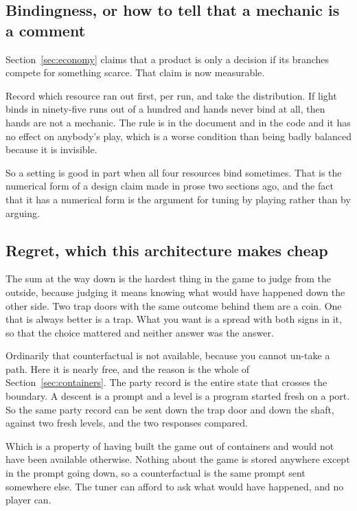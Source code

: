 \documentclass[11pt,a4paper]{article}
\begin{document}
\subsection{Bindingness, or how to tell that a mechanic is a comment}
\label{sec:bind}

Section~\ref{sec:economy} claims that a product is only a decision if its branches compete for
something scarce. That claim is now measurable.

Record which resource ran out first, per run, and take the distribution. If light binds in
ninety-five runs out of a hundred and hands never bind at all, then hands are not a mechanic. The
rule is in the document and in the code and it has no effect on anybody's play, which is a worse
condition than being badly balanced because it is invisible.

\begin{sectionbox}
So a setting is good in part when all four resources bind sometimes. That is the numerical form
of a design claim made in prose two sections ago, and the fact that it has a numerical form is
the argument for tuning by playing rather than by arguing.
\end{sectionbox}

\subsection{Regret, which this architecture makes cheap}
\label{sec:regret}

The sum at the way down is the hardest thing in the game to judge from the outside, because
judging it means knowing what would have happened down the other side. Two trap doors with the
same outcome behind them are a coin. One that is always better is a trap. What you want is a
spread with both signs in it, so that the choice mattered and neither answer was the answer.

Ordinarily that counterfactual is not available, because you cannot un-take a path. Here it is
nearly free, and the reason is the whole of Section~\ref{sec:containers}. The party record is the
entire state that crosses the boundary. A descent is a prompt and a level is a program started
fresh on a port. So the same party record can be sent down the trap door and down the shaft, against
two fresh levels, and the two responses compared.

\begin{sectionbox}
Which is a property of having built the game out of containers and would not have been available
otherwise. Nothing about the game is stored anywhere except in the prompt going down, so a
counterfactual is the same prompt sent somewhere else. The tuner can afford to ask what would
have happened, and no player can.
\end{sectionbox}
\end{document}
